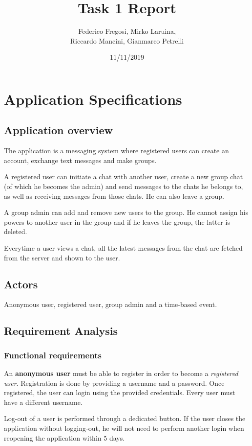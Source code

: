 \documentclass[10pt]{article}
\title{Task 1 Report}
\date{11/11/2019}
\author{Federico Fregosi, Mirko Laruina,\\
        Riccardo Mancini, Gianmarco Petrelli}
\begin{document}
\maketitle
\vfill
\tableofcontents
\vfill
\clearpage
\setcounter{page}{1}

\section{Application Specifications}
\subsection{Application overview}
The application is a messaging system where registered users can create an 
account, exchange text messages and make groups.

A registered user can initiate a chat with another user, create a new group chat
(of which he becomes the admin) and send messages to the chats he belongs to,
as well as receiving messages from those chats. He can also leave a group.

A group admin can add and remove new users to the group. He cannot assign his
powers to another user in the group and if he leaves the group, the latter 
is deleted.

Everytime a user views a chat, all the latest messages from the chat are fetched from 
the server and shown to the user.

\subsection{Actors}
Anonymous user, registered user, group admin and a time-based event.

\subsection{Requirement Analysis}
\subsubsection{Functional requirements}

An \textbf{anonymous user} must be able to register in order to become a 
\emph{registered user}. Registration is done by providing a username and a 
password. Once registered, the user can login using the provided credentials. 
Every user must have a different username.

Log-out of a user is performed through a dedicated button. If the user closes 
the application without logging-out, he will not need to perform another login 
when reopening the application within 5 days.
\end{document}
